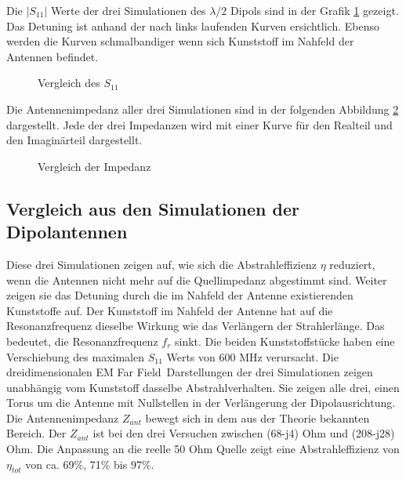 Die $|S_{11}|$ Werte der drei Simulationen des $\lambda/2$ Dipols sind in der Grafik \ref{S11_Vergleich_Simulation} gezeigt. Das Detuning ist anhand der nach links laufenden Kurven ersichtlich. Ebenso werden die Kurven schmalbandiger wenn sich Kunststoff im Nahfeld der Antennen befindet.

\begin{figure}[!ht]
	\centering
	\begingroup
	
	\endgroup
	\caption{Vergleich des $S_{11}$}
	\label{S11_Vergleich_Simulation}
\end{figure}
\newpage
Die Antennenimpedanz aller drei Simulationen sind in der folgenden Abbildung \ref{Impedanz_Vergleich_Simulation} dargestellt. Jede der drei Impedanzen wird mit einer Kurve für den Realteil und den Imaginärteil dargestellt. 
\begin{figure}[!ht]
	\centering
	\begingroup
	
	\endgroup
	\caption{Vergleich der Impedanz}
	\label{Impedanz_Vergleich_Simulation}
\end{figure}
\clearpage
\newpage

\subsection{Vergleich aus den Simulationen der Dipolantennen}
Diese drei Simulationen zeigen auf, wie sich die Abstrahleffizienz $\eta$ reduziert, wenn die Antennen nicht mehr auf die Quellimpedanz abgestimmt sind. Weiter zeigen sie das Detuning durch die im Nahfeld der Antenne existierenden Kunststoffe auf. Der Kunststoff im Nahfeld der Antenne hat auf die Resonanzfrequenz dieselbe Wirkung  wie das Verlängern der  Strahlerlänge. Das bedeutet, die Resonanzfrequenz $f_{r}$ sinkt.  Die beiden Kunststoffstücke haben eine Verschiebung des maximalen $S_{11}$ Werts von 600 MHz verursacht.
Die dreidimensionalen \glqq EM Far Field\grqq \  Darstellungen der drei Simulationen zeigen unabhängig vom Kunststoff dasselbe Abstrahlverhalten. Sie zeigen alle drei, einen Torus um die Antenne mit Nullstellen in der Verlängerung der Dipolausrichtung.\\
Die Antennenimpedanz $Z_{ant}$ bewegt sich in dem aus der Theorie \cite{elliott1981antenna} bekannten Bereich. Der $Z_{ant}$ ist bei den drei Versuchen zwischen (68-j4) Ohm und  (208-j28) Ohm. Die Anpassung an die reelle 50 Ohm Quelle zeigt eine Abstrahleffizienz von $\eta_{tot}$ von   ca. 69\%, 71\%  bis 97\%.\\

